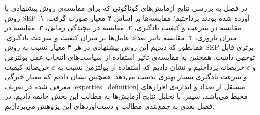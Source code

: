 در فصل به بررسی نتایج آزمایش‌های گوناگونی که برای مقایسه‌ی روش پیشنهادی با روش SEP آورده شده بودند پرداختیم؛ مقایسه‌ها بر اساس ۴ معیار صورت گرفت: ۱. مقایسه در سرعت و کیفیت یادگیری، ۲. مقایسه در پیچیدگی زمانی، ۳. مقایسه در میزان باروری، ۴. مقایسه تاثیر تعداد عامل‌ها بر میزان کیفیت و سرعت یادگیری. همانطور که دیدیم این روش پیشنهادی در هر ۴ معیار نسبت به روش SEP برتری قابل توجهی داشت. همچنین به مقایسه‌ی تاثیر استفاده از سیاست‌های انتخاب عمل بولتزمن و $\varepsilon$-حریصانه پرداختیم و نشان دادیم که استفاده از بولتزمن نسبت به $\varepsilon$-حریصانه کیفیت و سرعت یادگیری بسیار بهتری بدست می‌دهد. همچنین نشان دادیم که معیار خبرگی معرفی شده در تعریف \ref{experties_definition} مستقل از تعداد و اندازه‌ی افراز‌های محیط می‌باشد، سپس با تحلیل نتایج آزمایش‌ها به مطالب این بخش خاتمه دادیم. در فصل بعدی به جمع‌بندی مطالب و دست‌آورد‌های این پژوهش می‌پردازیم.